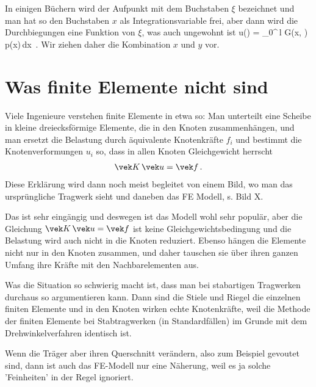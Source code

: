 In einigen B\"{u}chern wird der Aufpunkt mit dem Buchstaben $\xi$ bezeichnet und man hat so den Buchstaben $x$ als Integrationsvariable frei, aber dann wird die Durchbiegungen eine Funktion von $\xi$, was auch ungewohnt ist
\beq
u(\xi) = \int_0^{\,l} G(x, \xi)\,p(x)\,dx \,.
\eeq
Wir ziehen daher die Kombination $x$ und $y$ vor.\\

\section{Was finite Elemente nicht sind}
Viele Ingenieure verstehen finite Elemente in etwa so: Man unterteilt eine Scheibe in kleine dreiecksf\"{o}rmige Elemente, die in den Knoten zusammenh\"{a}ngen, und man ersetzt die Belastung durch \"{a}quivalente Knotenkr\"{a}fte $f_i$ und bestimmt die Knotenverformungen $u_i $ so, dass in  allen Knoten Gleichgewicht herrscht
\begin{align}
\vek K\,\vek u = \vek f\,.
\end{align}
Diese Erkl\"{a}rung wird dann noch meist begleitet von einem Bild, wo man das urspr\"{u}ngliche Tragwerk sieht und daneben das FE Modell, s. Bild X.

Das ist sehr eing\"{a}ngig und deswegen ist das Modell wohl sehr popul\"{a}r, aber die Gleichung $\vek K\,\vek u = \vek f$ ist keine Gleichgewichtsbedingung und die Belastung wird auch nicht in die Knoten reduziert. Ebenso h\"{a}ngen die Elemente nicht nur in den Knoten zusammen, und daher tauschen sie \"{u}ber ihren ganzen Umfang ihre Kr\"{a}fte mit den Nachbarelementen aus.

Was die Situation so schwierig macht ist, dass man bei stabartigen Tragwerken durchaus so argumentieren kann. Dann sind die  Stiele und Riegel die einzelnen finiten Elemente und in den Knoten wirken echte Knotenkr\"{a}fte, weil die Methode der finiten Elemente bei Stabtragwerken (in Standardf\"{a}llen) im Grunde mit dem Drehwinkelverfahren identisch ist.

Wenn die Tr\"{a}ger aber ihren Querschnitt ver\"{a}ndern, also zum Beispiel gevoutet sind, dann ist auch das FE-Modell nur eine N\"{a}herung, weil es ja solche 'Feinheiten' in der Regel ignoriert.


\subsubsection{}
